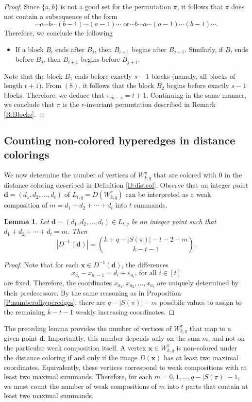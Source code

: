 \documentclass{birkjour}
\newtheorem{lem}[thm]{Lemma}
\theoremstyle{definition}
\theoremstyle{remark}
\numberwithin{equation}{section}
\begin{document}
\begin{proof}
Since $\{a,b\}$ is not a good set for the permutation $\pi$, it
follows that $\pi$ does not contain a subsequence of the form
$$\cdots a\cdots b\cdots (b-1) \cdots (a-1)\cdots \textrm{ or}
\cdots b\cdots a\cdots (a-1) \cdots (b-1)\cdots. $$ Therefore, we
conclude the following
\begin{itemize}
    \item[(8)] If a block $B_i$ ends after $B_j$, then $B_{i+1}$ begins
    after
    $B_{j+1}$. Similarly, if $B_i$ ends before $B_j$,
    then $B_{i+1}$ begins
before
    $B_{j+1}$.
\end{itemize}

Note that the block $B_1$ ends before exactly $s-1$ blocks
(namely, all blocks of length $t+1$). From $(8)$, it follows that
the block $B_2$ begins before exactly $s-1$ blocks. Therefore, we
deduce that $\pi_{m-s}=t+1$. Continuing in the same manner, we
conclude that $\pi$ is the $r$-invariant permutation described in
Remark \ref{R:Blocks}.

\end{proof}



\subsection{Counting non-colored hyperedges in distance colorings}
We now determine the number of vertices of $W^\pi_{k,q}$ that are
colored with $0$ in the distance coloring described in Definition
\ref{D:distcol}. Observe that an integer point
$\mathbf{d}=(d_1,d_2,\ldots,d_t)$ of $L_{t,q}=D(W^\pi_{k,q})$ can
be interpreted as a weak composition of $m=d_1+d_2+\cdots+d_t$
into $t$ summands.
\begin{lem}\label{L:inverzzaD} Let
$\mathbf{d}=(d_1,d_2,\ldots,d_t)\in L_{t,q}$ be an integer point
such that $d_1+d_2+\cdots+d_t=m$. Then
$$|D^{-1}(\mathbf{d})|={k+q-|S(\pi)|-t-2-m\choose k-t-1}.$$
\end{lem}
\begin{proof}Note that for each $\mathbf{x}\in D^{-1}(\mathbf{d})$, the
differences
$$x_{a_i}-x_{a_i-1}=d_i+\varepsilon_{a_i}\textrm{, for all }i \in [t]$$
are fixed. Therefore, the coordinates
$x_{a_1},x_{a_2},\ldots,x_{a_t}$ are uniquely determined by their
predecessors. By the same reasoning as in Proposition
\ref{P:numberofhyperedges}, there are $q-|S(\pi)|-m$ possibile
values to assign to the remaining $k-t-1$ weakly increasing
coordinates.
\end{proof}
\noindent The preceding lemma provides the number of vertices of
$W^\pi_{k,q}$ that map to a given point $\mathbf{d}$. Importantly,
this number depends only on the sum $m$, and not on the particular
weak composition itself. A vertex $\mathbf{x}\in W^\pi_{k,q}$ is
non-colored under the distance coloring if and only if the image
$D(\mathbf{x})$ has at least two maximal coordinates.
Equivalently, these vertices correspond to weak compositions with
at least two maximal summands. Therefore, for each
$m=0,1,\ldots,q-|S(\pi)|-1$, we must count the number of weak
compositions of $m$ into $t$ parts that contain at least two
maximal summands.
\end{document}
